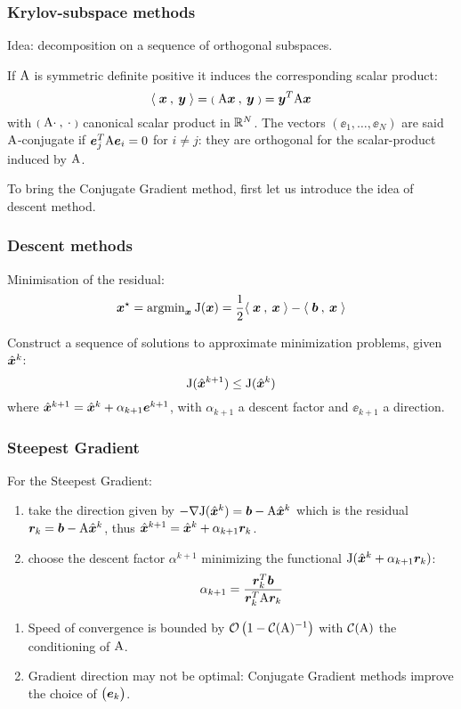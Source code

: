 \begin{frame}
  \frametitle{Krylov-subspace methods}

Idea: decomposition on a sequence of orthogonal subspaces.

\bigskip
If ${\mathrm A}$ is symmetric definite positive it induces the corresponding scalar product:
\[
{{\mathbf\langle}\;{\boldsymbol x}\:,\: {\boldsymbol y} \;{\rangle}} = {{\scriptstyle\mathbf{(}}\;{\mathrm A} {\boldsymbol x}\:,\: {\boldsymbol y} \;{\scriptstyle\mathbf{)}}} = {\boldsymbol y}^T{\mathrm A}{\boldsymbol x}
\]
with ${{\scriptstyle\mathbf{(}}\;{\mathrm A} \cdot\:,\: \cdot \;{\scriptstyle\mathbf{)}}}$ canonical scalar product in ${\mathbb{R}^N}$.
The vectors $(\ee_1, \dots, \ee_N)$ are said ${\mathrm A}$-conjugate if ${\boldsymbol e}_j^T{\mathrm A}{\boldsymbol e}_i = 0$ for $i\neq j$: they are orthogonal for the scalar-product induced by ${\mathrm A}$.

\bigskip
To bring the Conjugate Gradient method, first let us introduce the idea of descent method.

\end{frame}

\begin{frame}
  \frametitle{Descent methods}

Minimisation of the residual:
\begin{equation*}
{\boldsymbol x}^\star = \mathrm{argmin}_{\boldsymbol x} \:{\rm J}({\boldsymbol x}) = \frac{1}{2}{{\mathbf\langle}\;{\boldsymbol x}\:,\: {\boldsymbol x} \;{\rangle}} - {{\mathbf\langle}\;{\boldsymbol b}\:,\: {\boldsymbol x} \;{\rangle}}
\end{equation*}

Construct a sequence of solutions to approximate minimization problems, given $\hat{\boldsymbol x}^k$:
\[
{\rm J}(\hat{\boldsymbol x}^{k+1}) \leq {\rm J}(\hat{\boldsymbol x}^k)
\]
where $\hat{\boldsymbol x}^{k+1} = \hat{\boldsymbol x}^{k} + \alpha_{k+1} {\boldsymbol e}^{k+1}$, with $\alpha_{k+1}$ a descent factor and $\ee_{k+1}$ a direction.

\end{frame}

\begin{frame}
  \frametitle{Steepest Gradient}

For the Steepest Gradient:
\begin{enumerate}
\item take the direction given by $-\nabla{\rm J}(\hat{\boldsymbol x}^k) = {\boldsymbol b} - {\mathrm A} \hat{\boldsymbol x}^k$ which is the residual ${\boldsymbol r}_k = {\boldsymbol b} - {\mathrm A}\hat{\boldsymbol x}^k$, thus $\hat{\boldsymbol x}^{k+1} = \hat{\boldsymbol x}^{k} + \alpha_{k+1} {\boldsymbol r}_k$.
\item choose the descent factor $\alpha^{k+1}$ minimizing the functional ${\rm J}(\hat{\boldsymbol x}^{k} + \alpha_{k+1} {\boldsymbol r}_k)$:
\[
\alpha_{k+1} = \frac{{\boldsymbol r}_k^T{\boldsymbol b}}{{\boldsymbol r}_k^T{\mathrm A}{\boldsymbol r}_k}
\]
\end{enumerate}

\medskip
\begin{enumerate}
\item Speed of convergence is bounded by $\mathcal{O}\left(1- \mathcal{C}({\mathrm A})^{-1}\right)$ with $\mathcal{C}({\mathrm A})$ the conditioning of ${\mathrm A}$.
\item Gradient direction may not be optimal: Conjugate Gradient methods improve the choice of $\bigl({\boldsymbol e}_k\bigr)$.
\end{enumerate}

\end{frame}

